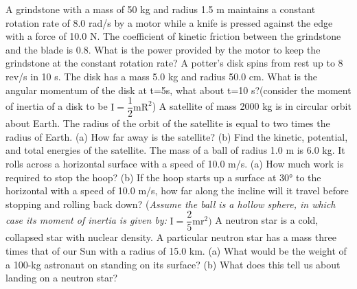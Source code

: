 \documentclass[9pt,addpoints]{exam}
\begin{document}
	\begin{questions}
		\question A grindstone with a mass of 50 kg and radius 1.5 m maintains a constant rotation rate of 8.0 rad/s by a motor while a knife is pressed against the edge with a force of 10.0 N. The coefficient of kinetic friction between the grindstone and the blade is 0.8. What is the power provided by the motor to keep the grindstone at the constant rotation rate?
		\question A potter’s disk spins from rest up to 8 rev/s in 10 s. The disk has a mass 5.0 kg and radius 50.0 cm. What is the angular momentum of the disk at  t=5s, what about t=10 s?(consider the moment of inertia of a disk to be $\text{I}=\dfrac{1}{2}\text{mR}^2$)
		\question A satellite of mass 2000 kg is in circular orbit about Earth. The radius of the orbit of the satellite is equal to two times the radius of Earth. (a) How far away is the satellite? (b) Find the kinetic, potential, and total energies of the satellite.
		\question The mass of a ball of radius 1.0 m is 6.0 kg. It rolls across a horizontal surface with a speed of 10.0 m/s. (a) How much work is required to stop the hoop? (b) If the hoop starts up a surface at  30°  to the horizontal with a speed of 10.0 m/s, how far along the incline will it travel before stopping and rolling back down? (\textit{Assume the ball is a hollow sphere, in which case its moment of inertia is given by:} $\text{I}=\dfrac{2}{5}\text{mr}^2)$
		\question A neutron star is a cold, collapsed star with nuclear density. A particular neutron star has a mass three times that of our Sun with a radius of 15.0 km. (a) What would be the weight of a 100-kg astronaut on standing on its surface? (b) What does this tell us about landing on a neutron star?
	\end{questions}		
\end{document}
